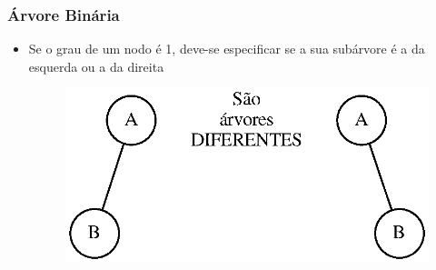 \documentclass[aspectratio=169]{beamer}
\begin{document}
\begin{frame}[fragile]\frametitle{Árvore Binária}
\begin{itemize}
	\item Se o grau de um nodo é 1, deve-se especificar se a sua subárvore é a da esquerda ou a da direita
\begin{figure}[h]
	\centering
	\includegraphics[height=0.35\paperheight]{imagens/arvores_binarias_diferentes.eps}
\end{figure}
\end{itemize}
\end{frame}
\end{document}

